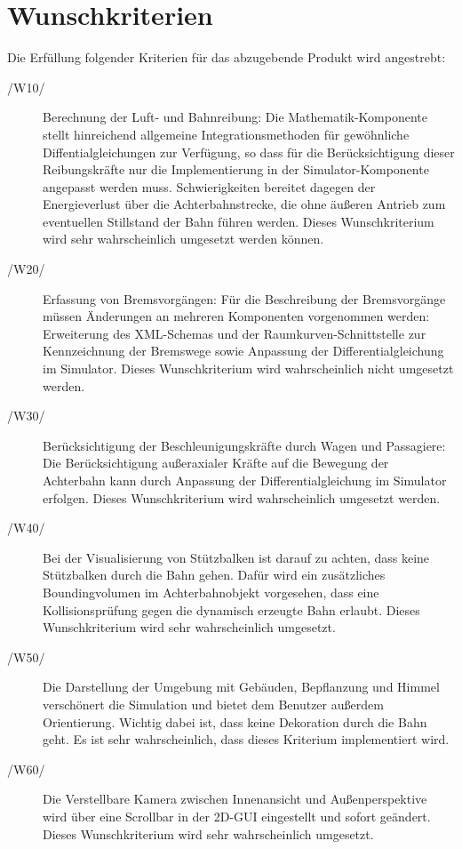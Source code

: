 \section{Wunschkriterien}

Die Erfüllung folgender Kriterien für das abzugebende Produkt wird angestrebt:
\begin{description}
	\item[/W10/] Berechnung der Luft- und Bahnreibung: Die Mathematik-Komponente stellt hinreichend allgemeine Integrationsmethoden für gewöhnliche Diffentialgleichungen zur Verfügung, so dass
		     für die Berücksichtigung dieser Reibungskräfte nur die Implementierung in der Simulator-Komponente angepasst werden muss. Schwierigkeiten bereitet dagegen der Energieverlust über
		     die Achterbahnstrecke, die ohne äußeren Antrieb zum eventuellen Stillstand der Bahn führen werden. Dieses Wunschkriterium wird sehr wahrscheinlich umgesetzt werden können.
	\item[/W20/] Erfassung von Bremsvorgängen: Für die Beschreibung der Bremsvorgänge müssen Änderungen an mehreren Komponenten vorgenommen werden: Erweiterung des XML-Schemas und
		     der Raumkurven-Schnittstelle zur Kennzeichnung der Bremswege sowie Anpassung der Differentialgleichung im Simulator. Dieses Wunschkriterium wird wahrscheinlich nicht umgesetzt werden.
	\item[/W30/] Berücksichtigung der Beschleunigungskräfte durch Wagen und Passagiere: Die Berücksichtigung außeraxialer Kräfte auf die Bewegung der Achterbahn kann durch Anpassung der
                     Differentialgleichung im Simulator erfolgen. Dieses Wunschkriterium wird wahrscheinlich umgesetzt werden.
	\item[/W40/] Bei der Visualisierung von Stützbalken ist darauf zu achten, dass keine Stützbalken durch die Bahn gehen. Dafür wird ein zusätzliches Boundingvolumen im Achterbahnobjekt vorgesehen, dass eine Kollisionsprüfung gegen die dynamisch erzeugte Bahn erlaubt. Dieses Wunschkriterium wird sehr wahrscheinlich umgesetzt.
	\item[/W50/] Die Darstellung der Umgebung mit Gebäuden, Bepflanzung und Himmel verschönert die Simulation und bietet dem Benutzer außerdem Orientierung. Wichtig dabei ist, dass keine Dekoration durch die Bahn geht. Es ist sehr wahrscheinlich, dass dieses Kriterium implementiert wird.
	\item[/W60/] Die Verstellbare Kamera zwischen Innenansicht und Außenperspektive wird über eine Scrollbar in der 2D-GUI eingestellt und sofort geändert. Dieses Wunschkriterium wird sehr wahrscheinlich umgesetzt.

\end{description}

